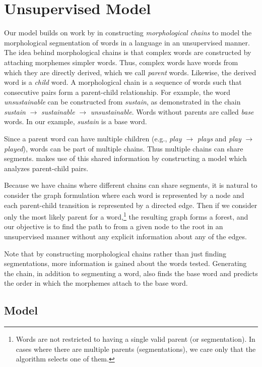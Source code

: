 \documentclass[11pt,twocolumn]{article}
\begin{document}

\section{Unsupervised Model}
Our model builds on work by \citeauthor{Narasimhan15} in constructing \emph{morphological chains} to model the morphological segmentation of words in a language in an unsupervised manner. The idea behind morphological chains is that complex words are constructed by attaching morphemes simpler words. Thus, complex words have words from which they are directly derived, which we call \emph{parent} words. Likewise, the derived word is a \emph{child} word. A morphological chain is a sequence of words such that consecutive pairs form a parent-child relationship. For example, the word \emph{unsustainable} can be constructed from \emph{sustain}, as demonstrated in the chain \emph{sustain} $\rightarrow$ \emph{sustainable} $\rightarrow$ \emph{unsustainable}. Words without parents are called \emph{base} words. In our example, \emph{sustain} is a base word.

Since a parent word can have multiple children (e.g., \emph{play} $\rightarrow$ \emph{plays} and \emph{play} $\rightarrow$ \emph{played}), words can be part of multiple chains. Thus multiple chains can share segments.
\citeauthor{Narasimhan15} makes use of this shared information by constructing a model which analyzes parent-child pairs.

Because we have chains where different chains can share segments, it is natural to consider the graph formulation where each word is represented by a node and each parent-child transition is represented by a directed edge. Then if we consider only the most likely parent for a word,\footnote{Words are not restricted to having a single valid parent (or segmentation). In cases where there are multiple parents (segmentations), we care only that the algorithm selects one of them.} the resulting graph forms a forest, and our objective is to find the path to from a given node to the root in an unsupervised manner without any explicit information about any of the edges.

Note that by constructing morphological chains rather than just finding segmentations, more information is gained about the words tested. Generating the chain, in addition to segmenting a word, also finds the base word and predicts the order in which the morphemes attach to the base word.

\subsection{Model}
\end{document}
